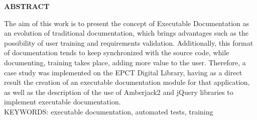 \begin{center}
\textbf{ABSTRACT}
\end{center}
\singlespacing

\noindent The aim of this work is to present the concept of Executable Documentation as an evolution of traditional documentation, which brings advantages such as the possibility of user training and requirements validation. Additionally, this format of documentation tends to keep synchronized with the source code, while documenting, training takes place, adding more value to the user. Therefore, a case study was implemented on the EPCT Digital Library, having as a direct result the creation of an executable documentation module for that application, as well as the description of the use of Amberjack2 and jQuery libraries to implement executable documentation. \\


\noindent KEYWORDS: executable documentation, automated tests, training